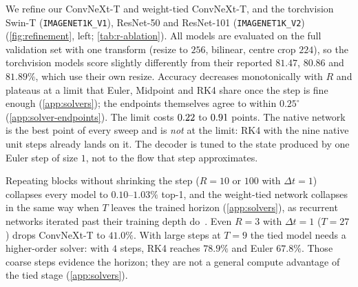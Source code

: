 We refine our ConvNeXt-T and weight-tied ConvNeXt-T, and the torchvision Swin-T
(\texttt{IMAGENET1K\_V1}), ResNet-50 and ResNet-101 (\texttt{IMAGENET1K\_V2})
(\cref{fig:refinement}, left; \cref{tab:r-ablation}).
All models are evaluated on the full validation set with one transform (resize to $256$,
bilinear, centre crop $224$), so the torchvision models score slightly differently from
their reported $81.47$, $80.86$ and $81.89\%$, which use their own resize.
Accuracy decreases monotonically with $R$ and plateaus at a limit that Euler,
Midpoint and RK4 share once the step is fine enough (\cref{app:solvers}); the
endpoints themselves agree to within $0.25^\circ$ (\cref{app:solver-endpoints}).
The limit costs $0.22$ to $0.91$ points.
The native network is the best point of every sweep and is \emph{not} at the limit:
RK4 with the nine native unit steps already lands on it.
The decoder is tuned to the state produced by one Euler step of size $1$, not to the
flow that step approximates.

Repeating blocks without shrinking the step ($R{=}10$ or $100$ with $\Delta t{=}1$)
collapses every model to $0.10$--$1.03\%$ top-1, and the weight-tied network collapses
in the same way when $T$ leaves the trained horizon (\cref{app:solvers}), as recurrent
networks iterated past their training depth do~\citep{bansal2022endtoend}.
Even $R{=}3$ with $\Delta t{=}1$ ($T{=}27$) drops ConvNeXt-T to $41.0\%$.
With large steps at $T{=}9$ the tied model needs a higher-order solver: with $4$
steps, RK4 reaches $78.9\%$ and Euler $67.8\%$.
Those coarse steps evidence the horizon; they are not a general compute advantage of
the tied stage (\cref{app:solvers}).
